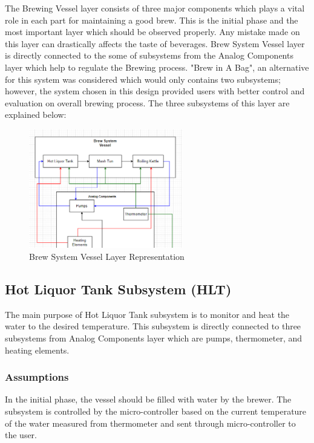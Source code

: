 The Brewing Vessel layer consists of three major components which plays a vital role in each part for maintaining a good brew. This is the initial phase and the most important layer which should be observed properly. Any mistake made on this layer can drastically affects the taste of beverages. Brew System Vessel layer is directly connected to the some of subsystems from the Analog Components layer which help to regulate the Brewing process. "Brew in A Bag", an alternative for this system was considered which would only contains two subsystems; however, the system chosen in this design provided users with better control and evaluation on overall brewing process. The three subsystems of this layer are explained below:

\begin{figure}[h!]
	\centering
	\includegraphics[width=0.60\textwidth]{images/Brew_System_Vessels}
	\caption{Brew System Vessel Layer Representation}
\end{figure}

\subsection{Hot Liquor Tank Subsystem (HLT)}
The main purpose of Hot Liquor Tank subsystem is to monitor and heat the water to the desired temperature. This subsystem is directly connected to three subsystems from Analog Components layer which are pumps, thermometer, and heating elements.

\subsubsection{Assumptions}
In the initial phase, the vessel should be filled with water by the brewer. The subsystem is controlled by the micro-controller based on the current temperature of the water measured from thermometer and sent through micro-controller to the user.

